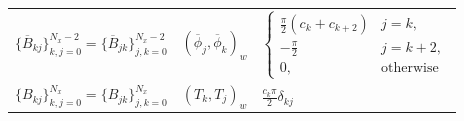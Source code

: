 \documentclass[preprint]{elsarticle}
\newcommand{\D}[1]{\overline{#1}}
\begin{document}
\begin{table}
\begin{tabular}{ccl}
$\{\D{B}_{kj}\}_{k,j=0}^{N_x-2} = \{\D{B}_{jk}\}_{j,k=0}^{N_x-2}$ & $(\D{\phi}_j, \D{\phi}_k)_w$ & $ \begin{cases} 
\frac{\pi}{2} (c_k+c_{k+2}) &j=k, \\
-\frac{\pi}{2} &j=k + 2, \\
0, &\text{otherwise}
\end{cases}$ \\

$\{B_{kj}\}_{k,j=0}^{N_x} = \{B_{jk}\}_{j,k=0}^{N_x}$ & $(T_k, T_j)_w$ & $\frac{c_k \pi}{2} \delta_{kj}$

	\end{tabular}
\end{table}
\end{document}
